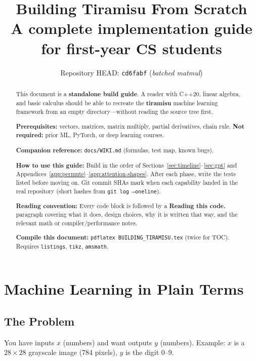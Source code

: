 \documentclass[11pt,a4paper]{article}
\title{\textbf{Building Tiramisu From Scratch}\\[0.4em]
\large A complete implementation guide for first-year CS students}
\author{}
\date{Repository HEAD: \texttt{cd6fabf} (\emph{batched matmul})}
\begin{document}
\maketitle

\begin{abstract}
\noindent
This document is a \textbf{standalone build guide}. A reader with C++20, linear algebra,
and basic calculus should be able to recreate the \textbf{tiramisu} machine learning
framework from an empty directory---without reading the source tree first.

\textbf{Prerequisites:} vectors, matrices, matrix multiply, partial derivatives, chain rule.
\textbf{Not required:} prior ML, PyTorch, or deep learning courses.

\textbf{Companion reference:} \texttt{docs/WIKI.md} (formulas, test map, known bugs).

\textbf{How to use this guide:} Build in the order of Sections~\ref{sec:timeline}--\ref{sec:gpt}
and Appendices~\ref{app:permute}--\ref{app:attention-shapes}. After each phase, write the
tests listed before moving on. Git commit SHAs mark when each capability landed in the real
repository (short hashes from \texttt{git log --oneline}).

\textbf{Reading convention:} Every code block is followed by a \textbf{Reading this code.}
paragraph covering what it does, design choices, why it is written that way, and the relevant
math or compiler/performance notes.

\textbf{Compile this document:}
\texttt{pdflatex BUILDING\_TIRAMISU.tex} (twice for TOC). Requires \texttt{listings},
\texttt{tikz}, \texttt{amsmath}.
\end{abstract}

\tableofcontents
\newpage

\section{Machine Learning in Plain Terms}
\label{sec:ml-intro}

\subsection{The Problem}

You have inputs $x$ (numbers) and want outputs $y$ (numbers). Example: $x$ is a
$28\times 28$ grayscale image (784 pixels), $y$ is the digit 0--9.
\end{document}
